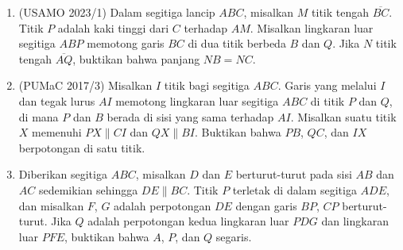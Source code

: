 \documentclass[12pt]{scrartcl}
\begin{document}
\begin{enumerate}
\item (USAMO 2023/1) Dalam segitiga lancip $ABC$, misalkan $M$ titik tengah $\overline{BC}$. Titik $P$ adalah kaki tinggi dari $C$ terhadap $AM$. Misalkan lingkaran luar segitiga $ABP$ memotong garis $BC$ di dua titik berbeda $B$ dan $Q$. Jika $N$ titik tengah $\overline{AQ}$, buktikan bahwa panjang $NB=NC$.
\item (PUMaC 2017/3) Misalkan $I$ titik bagi segitiga $ABC$. Garis yang melalui $I$ dan tegak lurus $AI$ memotong lingkaran luar segitiga $ABC$ di titik $P$ dan $Q$, di mana $P$ dan $B$ berada di sisi yang sama terhadap $AI$. Misalkan suatu titik $X$ memenuhi $PX\parallel CI$ dan $QX\parallel BI$. Buktikan bahwa $PB$, $QC$, dan $IX$ berpotongan di satu titik.
\item Diberikan segitiga $ABC$, misalkan $D$ dan $E$ berturut-turut pada sisi $AB$ dan $AC$ sedemikian sehingga $DE\parallel BC$. Titik $P$ terletak di dalam segitiga $ADE$, dan misalkan $F$, $G$ adalah perpotongan $DE$ dengan garis $BP$, $CP$ berturut-turut. Jika $Q$ adalah perpotongan kedua lingkaran luar $PDG$ dan lingkaran luar $PFE$, buktikan bahwa $A$, $P$, dan $Q$ segaris. 
\end{enumerate}
\end{document}
